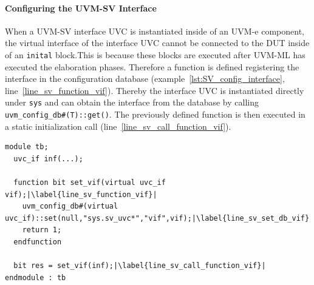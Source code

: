 \paragraph{Configuring the UVM-SV Interface}
When a UVM-SV interface UVC is instantiated inside of an UVM-e component, the virtual interface of the interface UVC cannot be connected to the DUT inside of an \lstinline$inital$ block.This is because these blocks are executed after UVM-ML has executed the elaboration phases. Therefore a function is defined registering the interface in the configuration database (example~\ref{lst:SV_config_interface}, line~\ref{line_sv_function_vif}). Thereby the interface UVC is instantiated directly under \lstinline$sys$ and can obtain the interface from the database by calling \lstinline$uvm_config_db#(T)::get()$. The previously defined function is then executed in a static initialization call (line~\ref{line_sv_call_function_vif}).
\lstset{language=SystemVerilog, numbers = left, escapechar=|, breaklines=true}
\begin{lstlisting}[frame=htrbl, caption={SystemVerilog: configuring the UVM-SV interface},
label={lst:SV_config_interface}]
module tb;
  uvc_if inf(...);
	
  function bit set_vif(virtual uvc_if vif);|\label{line_sv_function_vif}|
    uvm_config_db#(virtual uvc_if)::set(null,"sys.sv_uvc*","vif",vif);|\label{line_sv_set_db_vif}|
    return 1;
  endfunction

  bit res = set_vif(inf);|\label{line_sv_call_function_vif}|
endmodule : tb
\end{lstlisting}

